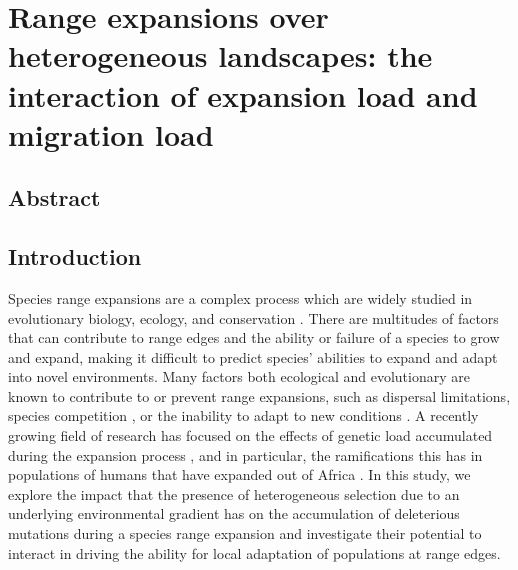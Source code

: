 \chapter{Range expansions over heterogeneous landscapes: the interaction of expansion load and migration load}%
\label{chap:expansionload}

\section{Abstract}


\section{Introduction}

Species range expansions are a complex process which are widely studied in evolutionary biology, ecology, and conservation \citep{Chen:2011, Colautti:2013, Hastings:2005, Phillips:2006, Excoffier:2009, Hallatschek:2010}. There are multitudes of factors that can contribute to range edges and the ability or failure of a species to grow and expand, making it difficult to predict species' abilities to expand and adapt into novel environments. Many factors both ecological and evolutionary are known to contribute to or prevent range expansions, such as dispersal limitations\citep{Hargreaves:2014b, Marsico:2009, Hastings:2005}, species competition \citep{Case:2000, Price:2009,Svenning:2014, Louthan:2015}, or the inability to adapt to new conditions \citep{Polechova:2015, Holt:2011, Angert:2008}. A recently growing field of research has focused on the effects of genetic load accumulated during the expansion process \citep{Excoffier:2009, Hallatschek:2010, Peischl:2013, Peischl:2015, Peischl:2015b}, and in particular, the ramifications this has in populations of humans that have expanded out of Africa \citep{Henn:2015, Do:2015, Lohmueller:2008}. In this study, we explore the impact that the presence of heterogeneous selection due to an underlying environmental gradient has on the accumulation of deleterious mutations during a species range expansion and investigate their potential to interact in driving the ability for local adaptation of populations at range edges.

